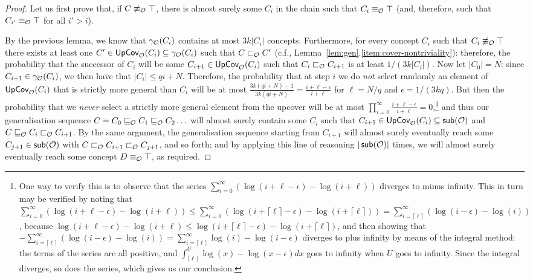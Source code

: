 \documentclass[
]{ceurart}
\begin{document}
\begin{proof}
Let us first prove that, if $C \not \equiv_\mathcal{O} \top$, there is almost surely some $C_i$ in the chain such that $C_i \equiv_\mathcal{O} \top$ (and, therefore, such that $C_{i'} \equiv_\mathcal{O} \top$ for all $i' > i$). 

By the previous lemma, we know that $\gamma_\mathcal{O}(C_i)$ contains at most $3k|C_i|$ concepts. Furthermore, for every concept $C_i$ such that $C_i \not \equiv_\mathcal{O} \top$ there exists at least one $C' \in \textsf{UpCov}_\mathcal{O}(C_i) \subseteq \gamma_\mathcal{O}(C_i)$ such that $C \sqsubset_\mathcal{O} C'$ (c.f., Lemma~\ref{lem:gen}.\ref{item:cover-nontriviality}): therefore, the probability that the successor of $C_i$ will be some $C_{i+1} \in \textsf{UpCov}_\mathcal{O}(C_i)$ such that $C_i \sqsubset_\mathcal{O} C_{i+1}$ is at least $1/(3k|C_i|)$. Now let $|C_0| = N$: since $C_{i+1} \in \gamma_\mathcal{O}(C_i)$, we then have that $|C_i| \leq qi + N$. Therefore, the probability that at step $i$ we do \emph{not} select randomly an element of $\textsf{UpCov}_\mathcal{O}(C_i)$ that is strictly more general than $C_i$ will be at most 
$\frac{3k(qi + N) - 1}{3k(qi + N)} = \frac{i + \ell - \epsilon}{i + \ell}$ 
for $\ell = N/q$ and $\epsilon = 1/(3kq)$. But then the probability that we \emph{never} select a strictly more general element from the upcover  will be at most $
    \prod_{i = 0}^\infty \frac{i + \ell - \epsilon}{i+\ell} =  0$,\footnote{One way to verify this is to observe that the series $\sum_{i=0}^\infty (\log(i + \ell -\epsilon) - \log(i + \ell))$ diverges to minus infinity. This in turn may be verified by noting that $\sum_{i=0}^\infty (\log(i + \ell -\epsilon) - \log(i + \ell)) \leq \sum_{i=0}^\infty (\log(i + \lceil \ell\rceil -\epsilon) - \log(i + \lceil \ell \rceil)) = \sum_{i=\lceil \ell \rceil}^\infty (\log(i -\epsilon) - \log(i))$, because $\log (i + \ell - \epsilon) - \log(i + \ell) \leq \log(i+\lceil \ell \rceil - \epsilon) - \log(i + \lceil \ell\rceil)$, and then showing that  $-\sum_{i=\lceil \ell \rceil}^\infty (\log(i -\epsilon) - \log(i)) = \sum_{i=\lceil \ell \rceil}^\infty \log (i) - \log(i-\epsilon)$ diverges to plus infinity by means of the integral method: the terms of the series are all positive, and $\int_{\lceil \ell \rceil}^U \log(x) - \log(x-\epsilon) dx$ goes to infinity when $U$ goes to infinity. Since the integral diverges, so does the series, which gives us our conclusion.}
and thus our generalisation sequence $C = C_0 \sqsubseteq_\mathcal{O} C_1 \sqsubseteq_\mathcal{O} C_2 \ldots$ will almost surely contain some $C_i$ such that  $C_{i+1} \in \textsf{UpCov}_\mathcal{O}(C_i) \subseteq \mathop{\mathsf{sub}}(\mathcal{O})$ and $C \sqsubseteq_\mathcal{O} C_i \sqsubset_\mathcal{O} C_{i+1}$. By the same argument, the generalisation sequence starting from $C_{i+1}$ will almost surely eventually reach some $C_{j+1} \in \mathop{\mathsf{sub}}(\mathcal{O})$ with $C \sqsubset_\mathcal{O} C_{i+1} \sqsubset_\mathcal{O} C_{j+1}$, and so forth; and by applying this line of reasoning $|\mathop{\mathsf{sub}}(\mathcal{O})|$ times, we will almost surely eventually reach some concept $D \equiv_\mathcal{O} \top$, as required.  


\end{proof}
\end{document}
